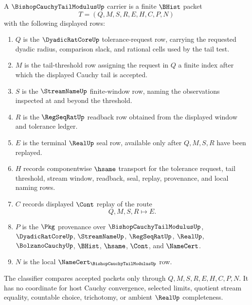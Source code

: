 \begin{definition}
\label{def:bishop-cauchy-tail-modulus-carrier}
A $\BishopCauchyTailModulusUp$ carrier is a finite $\BHist$ packet
$$
T=(Q,M,S,R,E,H,C,P,N)
$$
with the following displayed rows:
\begin{enumerate}
\item $Q$ is the $\DyadicRatCoreUp$ tolerance-request row, carrying the requested dyadic radius, comparison slack, and rational cells used by the tail test.
\item $M$ is the tail-threshold row assigning the request in $Q$ a finite index after which the displayed Cauchy tail is accepted.
\item $S$ is the $\StreamNameUp$ finite-window row, naming the observations inspected at and beyond the threshold.
\item $R$ is the $\RegSeqRatUp$ readback row obtained from the displayed window and tolerance ledger.
\item $E$ is the terminal $\RealUp$ seal row, available only after $Q,M,S,R$ have been replayed.
\item $H$ records componentwise $\hsame$ transport for the tolerance request, tail threshold, stream window, readback, seal, replay, provenance, and local naming rows.
\item $C$ records displayed $\Cont$ replay of the route
$$
Q,M,S,R \longmapsto E .
$$
\item $P$ is the $\Pkg$ provenance over $\BishopCauchyTailModulusUp$, $\DyadicRatCoreUp$, $\StreamNameUp$, $\RegSeqRatUp$, $\RealUp$, $\BolzanoCauchyUp$, $\BHist$, $\hsame$, $\Cont$, and $\NameCert$.
\item $N$ is the local $\NameCert_{\BishopCauchyTailModulusUp}$ row.
\end{enumerate}
The classifier compares accepted packets only through $Q,M,S,R,E,H,C,P,N$. It has no coordinate for host Cauchy convergence, selected limits, quotient stream equality, countable choice, trichotomy, or ambient $\RealUp$ completeness.
\end{definition}

